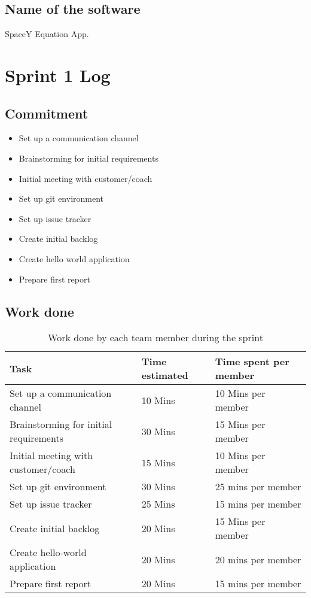\documentclass[14]{article}
\begin{document}
\subsection{Name of the software}
SpaceY Equation App.
\section{Sprint 1 Log}
\subsection{Commitment}
\begin{itemize}
    \item Set up a communication channel
    \item Brainstorming for initial requirements
    \item Initial meeting with customer/coach
    \item Set up git environment
    \item Set up issue tracker
    \item Create initial backlog
    \item Create hello world application
    \item Prepare first report
\end{itemize}
\subsection{Work done}

\begin{table}[H]
    \centering
    \begin{tabular}{l|l|l|}
        \textbf{Task} & \textbf{Time estimated} & \textbf{Time spent per member}  \\
        \hline
        Set up a communication channel & 10 Mins & 10 Mins per member \\
        Brainstorming for initial requirements & 30 Mins & 15 Mins per member\\
        Initial meeting with customer/coach & 15 Mins & 10 Mins per member \\
        Set up git environment & 30 Mins & 25 mins per member \\
        Set up issue tracker & 25 Mins & 15 mins per member \\
        Create initial backlog & 20 Mins & 15 Mins per member \\
        Create hello-world application & 20 Mins & 20 mins per member  \\
        Prepare first report & 20 Mins & 15 mins per member \\
    \end{tabular}
    \caption{Work done by each team member during the sprint}
    \label{tab:my_label}
\end{table}
\end{document}
